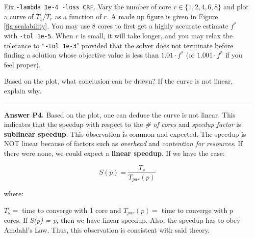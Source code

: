 \documentclass[11pt]{report}
\begin{document}

%

Fix \verb!-lambda 1e-4 -loss CRF!.
Vary the number of core $r \in \{1, 2, 4, 6, 8\}$ and plot a curve of $T_1 / T_r$ as a function of $r$.
A made up figure is given in Figure \ref{fig:scalability}.
You may use 8 cores to first get a highly accurate estimate $f^*$ with \verb!-tol 1e-5!.
When $r$ is small, it will take longer, and you may relax the tolerance to ``\verb!-tol 1e-3!" provided that the solver does not terminate before finding a solution whose objective value is less than $1.01 \cdot f^*$ (or $1.001 \cdot f^*$ if you feel proper).

Based on the plot, what conclusion can be drawn?
If the curve is not linear, explain why.

\rule{\paperwidth}{0.6pt}
{\bf Answer P4.} Based on the plot, one can deduce the curve is not linear. This indicates that the speedup with respect to the \textit{\# of cores} and \textit{speedup factor} is \textbf{sublinear speedup}. This observation is common and expected. The speedup is NOT linear because of factors such as \textit{overhead} and \textit{contention for resources}. If there were none, we could expect a \textbf{linear speedup}. If we have the case:

$$S(p) = \frac{T_{s}}{T_{par}(p)}$$

where:

$T_{s} = $ time to converge with 1 core and $T_{par}(p) = $ time to converge with p cores. If \textit{S(p) = p}, then we have linear speedup. Also, the speedup has to obey Amdahl's Law. Thus, this observation is consistent with said theory.
\end{document}
